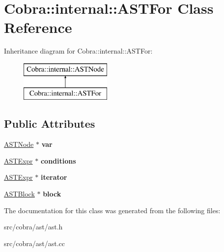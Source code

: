 \hypertarget{class_cobra_1_1internal_1_1_a_s_t_for}{\section{Cobra\+:\+:internal\+:\+:A\+S\+T\+For Class Reference}
\label{class_cobra_1_1internal_1_1_a_s_t_for}
}
Inheritance diagram for Cobra\+:\+:internal\+:\+:A\+S\+T\+For\+:\begin{figure}[H]
\begin{center}
\leavevmode
\includegraphics[height=2.000000cm]{class_cobra_1_1internal_1_1_a_s_t_for}
\end{center}
\end{figure}
\subsection*{Public Attributes}
\begin{DoxyCompactItemize}
\item 
\hypertarget{class_cobra_1_1internal_1_1_a_s_t_for_a61962164f3d93fc5d680090b056ff8b7}{\hyperlink{class_cobra_1_1internal_1_1_a_s_t_node}{A\+S\+T\+Node} $\ast$ {\bfseries var}}\label{class_cobra_1_1internal_1_1_a_s_t_for_a61962164f3d93fc5d680090b056ff8b7}

\item 
\hypertarget{class_cobra_1_1internal_1_1_a_s_t_for_ae895f2e05ca9372a84c5ddeb75742386}{\hyperlink{class_cobra_1_1internal_1_1_a_s_t_expr}{A\+S\+T\+Expr} $\ast$ {\bfseries conditions}}\label{class_cobra_1_1internal_1_1_a_s_t_for_ae895f2e05ca9372a84c5ddeb75742386}

\item 
\hypertarget{class_cobra_1_1internal_1_1_a_s_t_for_aabc648bff8efded5efdfeb4e386b40fa}{\hyperlink{class_cobra_1_1internal_1_1_a_s_t_expr}{A\+S\+T\+Expr} $\ast$ {\bfseries iterator}}\label{class_cobra_1_1internal_1_1_a_s_t_for_aabc648bff8efded5efdfeb4e386b40fa}

\item 
\hypertarget{class_cobra_1_1internal_1_1_a_s_t_for_a2e7a7694dc5527a8936305e70e7438ed}{\hyperlink{class_cobra_1_1internal_1_1_a_s_t_block}{A\+S\+T\+Block} $\ast$ {\bfseries block}}\label{class_cobra_1_1internal_1_1_a_s_t_for_a2e7a7694dc5527a8936305e70e7438ed}

\end{DoxyCompactItemize}


The documentation for this class was generated from the following files\+:\begin{DoxyCompactItemize}
\item 
src/cobra/ast/ast.\+h\item 
src/cobra/ast/ast.\+cc\end{DoxyCompactItemize}
